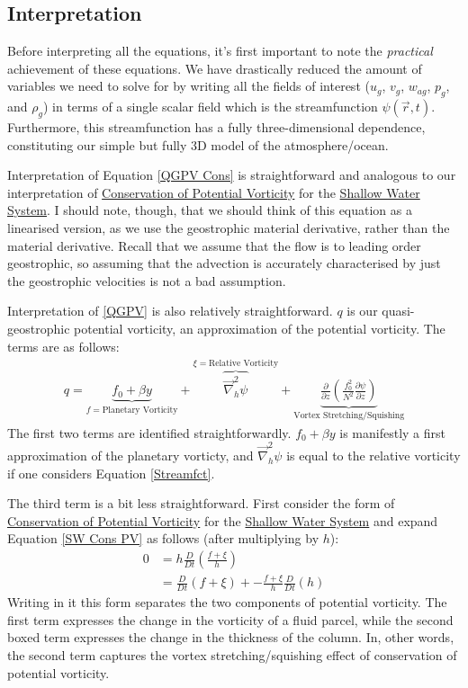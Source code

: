 \subsection{Interpretation}

Before interpreting all the equations, it's first important to note the \textit{practical} achievement of these equations. We have drastically reduced the amount of variables we need to solve for by writing all the fields of interest (\(u_g\), \(v_g\), \(w_{ag}\), \(p_g\), and \(\rho_g\)) in terms of a single scalar field which is the streamfunction \(\psi(\vec{r},t)\). Furthermore, this streamfunction has a fully three-dimensional dependence, constituting our simple but fully 3D model of the atmosphere/ocean. 

Interpretation of Equation \ref{QGPV Cons} is straightforward and analogous to our interpretation of \hyperref[Cons PV Box]{Conservation of Potential Vorticity} for the \hyperref[Shallow Water System]{Shallow Water System}. I should note, though, that we should think of this equation as a linearised version, as we use the geostrophic material derivative, rather than the material derivative. Recall that we assume that the flow is to leading order geostrophic, so assuming that the advection is accurately characterised by just the geostrophic velocities is not a bad assumption.

Interpretation of \ref{QGPV} is also relatively straightforward. \(q\) is our quasi-geostrophic potential vorticity, an approximation of the potential vorticity. The terms are as follows:
\begin{align*}
    q = \underbrace{f_0 + \beta y}_{f=\text{Planetary Vorticity}}
    +
    \overbrace{\vec{\nabla}_h^2 \psi}^{\xi=\text{Relative Vorticity}}
    +\underbrace{\frac{\partial }{\partial z}\left( \frac{f_0^2}{N^2} \frac{\partial \psi}{\partial z} \right)}_\text{Vortex Stretching/Squishing}
\end{align*}
The first two terms are identified straightforwardly. \(f_0+\beta y\) is manifestly a first approximation of the planetary vorticty, and \(\vec{\nabla}_h^2\psi\) is equal to the relative vorticity if one considers Equation \ref{Streamfct}. 

The third term is a bit less straightforward. First consider the form of \hyperref[Cons PV Box]{Conservation of Potential Vorticity} for the \hyperref[Shallow Water System]{Shallow Water System} and expand Equation \ref{SW Cons PV} as follows (after multiplying by \(h\)):
\begin{align*}
    0&=h\frac{D}{Dt}\left( \frac{f+\xi}{h} \right)
    \\
    &=
    \frac{D}{Dt}(f+\xi) + \boxed{-\frac{f+\xi}{h}\frac{D}{Dt}(h)}
\end{align*}
Writing in it this form separates the two components of potential vorticity. The first term expresses the change in the vorticity of a fluid parcel, while the second boxed term expresses the change in the thickness of the column. In, other words, the second term captures the vortex stretching/squishing effect of conservation of potential vorticity.

